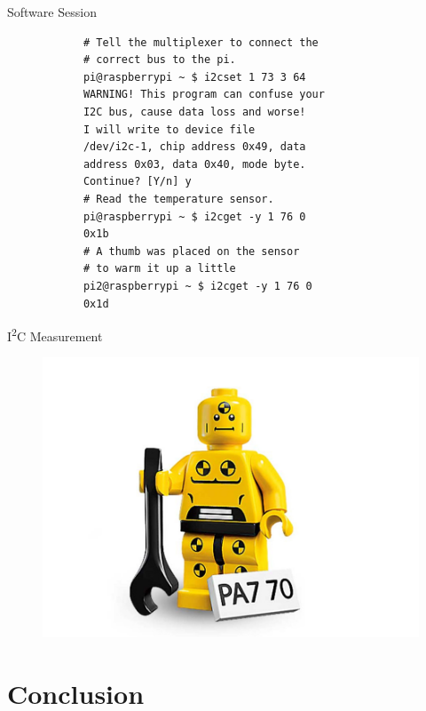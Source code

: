 \documentclass[]{beamer} %
\newcommand{\twi}{I\textsuperscript{2}C\xspace}
\newenvironment{changemargin}[2]
{
	\begin{list}{}
		{
			\setlength{\topsep}{0pt}
			\setlength{\leftmargin}{#1}
			\setlength{\rightmargin}{#2}
			\setlength{\listparindent}{\parindent}
		\setlength{\itemindent}{\parindent}
			\setlength{\parsep}{\parskip}
		}
	\item[]
	}
	{
	\end{list}
}
\begin{document}
\begin{frame}[fragile]{Software Session}
	\begin{minipage}[c][.4\textheight][c]{\linewidth}
		\begin{verbatim}
			# Tell the multiplexer to connect the
			# correct bus to the pi.
			pi@raspberrypi ~ $ i2cset 1 73 3 64
			WARNING! This program can confuse your
			I2C bus, cause data loss and worse!
			I will write to device file
			/dev/i2c-1, chip address 0x49, data
			address 0x03, data 0x40, mode byte.
			Continue? [Y/n] y
			# Read the temperature sensor.
			pi@raspberrypi ~ $ i2cget -y 1 76 0
			0x1b
			# A thumb was placed on the sensor
			# to warm it up a little
			pi2@raspberrypi ~ $ i2cget -y 1 76 0
			0x1d
		\end{verbatim}
	\end{minipage}
\end{frame}

\begin{frame}{\twi Measurement}
	\begin{changemargin}{-0.6cm}{+1cm}
		\begin{figure}
			\includegraphics[width=1.1\textwidth]{dummy}
		\end{figure}
	\end{changemargin}
\end{frame}

\section[Conclusion]{Conclusion}
\end{document}
